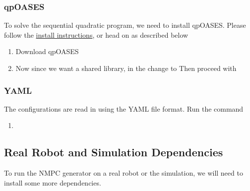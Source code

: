 \subsubsection{qpOASES}
To solve the sequential quadratic program, we need to install qpOASES. Please follow the \href{https://projects.coin-or.org/qpOASES/wiki/QpoasesInstallation}{install instructions}, or head on as described below
\begin{enumerate}
	\item Download qpOASES
	\newline {}
	\newline {}
	\newline {}
	\item Now since we want a shared library, in the  change 
	\newline {} to
	\newline {}
	\newline Then proceed with
	\newline {}
	\newline {}
	\newline {}
	\newline {}
\end{enumerate}
\FloatBarrier
\subsubsection{YAML}
The configurations are read in using the YAML file format. Run the command
\begin{enumerate}
	\item {}
\end{enumerate}
\FloatBarrier
\subsection{Real Robot and Simulation Dependencies}
\label{sec::A52_rs}
To run the NMPC generator on a real robot or the simulation, we will need to install some more dependencies.
\FloatBarrier
